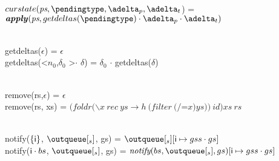 \documentclass[envcountsect,runningheads,orivec]{llncs}
\begin{document}
\begin{flushleft}
 \\
$curstate(\state, \pending, \pushbuffer, \transactionbuffer$) = $\applyplus{\state}{getdeltas(\pending) \cdot\pushbuffer\cdot \transactionbuffer}$
\end{flushleft}


\begin{flushleft}
 \\
getdeltas($\epsilon$) = $\epsilon$ \\
getdeltas(\textless $n_0$,$\delta_0$ \textgreater $\cdot$ $\delta$) = $\delta_0$ $\cdot$ getdeltas($\delta$)\\
\end{flushleft}

\begin{flushleft}
 \\
remove(rs,$\epsilon$) = $\epsilon$ \\
remove(rs, xs) = $(foldr (\backslash x\ rec\ ys\to h \ (filter \ (/$=$x) ys))\ id) xs \ rs$\\
\end{flushleft}


\begin{flushleft}
\\
notify($\{{\sf i}\}$, $\outserver$, gs) = $\outserver[\cid \mapsto gss \cdot gs]$\\
notify(${\sf i} \cdot bs$, $\outserver$, gs) = $\notify{bs}{\outserver}{gs}[\cid \mapsto gss \cdot gs]$ 
\end{flushleft}

\end{document}
